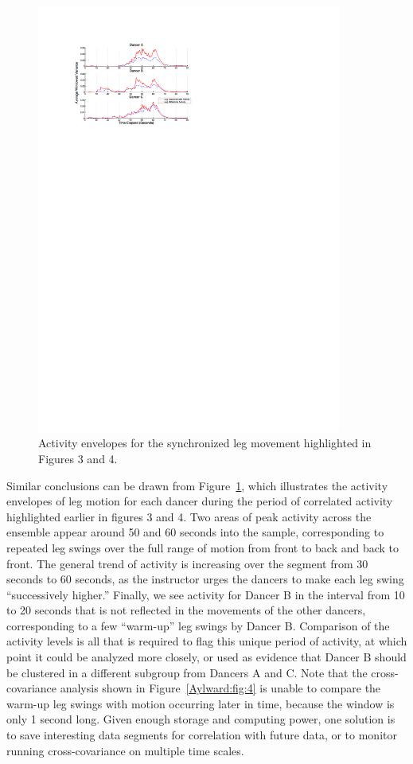 \begin{figure}[t]
\centering
\includegraphics[width=100mm]{jp_fig6} 
\caption{Activity envelopes for the synchronized leg movement
highlighted in Figures 3 and 4.}
\label{Aylward:fig:6} 
\end{figure}

Similar conclusions can be drawn from Figure~\ref{Aylward:fig:6}, which illustrates the activity
envelopes of leg motion for each dancer during the period of correlated activity
highlighted earlier in figures 3 and 4.  Two areas of peak activity across the
ensemble appear around 50 and 60 seconds into the sample, corresponding to
repeated leg swings over the full range of motion from front to back and back to
front.  The general trend of activity is increasing over the segment from 30
seconds to 60 seconds, as the instructor urges the dancers to make each leg swing
``successively higher.''  Finally, we see activity for Dancer B in the interval
from 10 to 20 seconds that is not reflected in the movements of the other
dancers, corresponding to a few ``warm-up'' leg swings by Dancer B. Comparison of
the activity levels is all that is required to flag this unique period of
activity, at which point it could be analyzed more closely, or used as evidence
that Dancer B should be clustered in a different subgroup from Dancers A and C.
Note that the cross-covariance analysis shown in Figure~\ref{Aylward:fig:4} is unable to compare
the warm-up leg swings with motion occurring later in time, because the window is
only 1 second long. Given enough storage and computing power, one solution is to
save interesting data segments for correlation with future data, or to monitor
running cross-covariance on multiple time scales.

